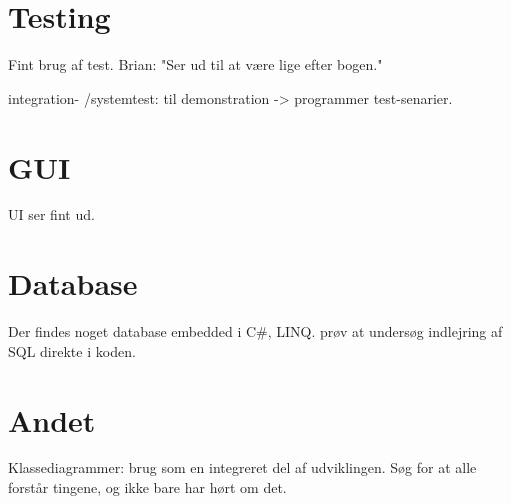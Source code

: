 \documentclass{article}
\begin{document}
\section{Testing}

Fint brug af test. Brian: "Ser ud til at være lige efter bogen."

integration- /systemtest: til demonstration -> programmer test-senarier.


\section{GUI}

UI ser fint ud.

\section{Database}

Der findes noget database embedded i C\#, LINQ. prøv at undersøg indlejring af SQL direkte i koden.

\section{Andet}

Klassediagrammer: brug som en integreret del af udviklingen.
Søg for at alle forstår tingene, og ikke bare har hørt om det.
\end{document}
